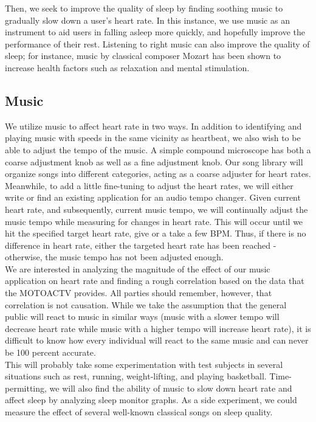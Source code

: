 \documentclass[letterpaper,english, 12pt]{scrreprt}
\begin{document}
Then, we seek to improve the quality of sleep by finding soothing music to gradually slow down a user's heart rate. In this instance, we use music as an instrument to aid users in falling asleep more quickly, and hopefully improve the performance of their rest. Listening to right music can also improve the quality of sleep; for instance, music by classical composer Mozart has been shown to increase health factors such as relaxation and mental stimulation.\\
			 
\subsection{Music}
We utilize music to affect heart rate in two ways. In addition to identifying and playing music with speeds in the same vicinity as heartbeat, we also wish to be able to adjust the tempo of the music. A simple compound microscope has both a coarse adjustment knob as well as a fine adjustment knob. Our song library will organize songs into different categories, acting as a coarse adjuster for heart rates. Meanwhile, to add a little fine-tuning to adjust the heart rates, we will either write or find an existing application for an audio tempo changer. Given current heart rate, and subsequently, current music tempo, we will continually adjust the music tempo while measuring for changes in heart rate. This will occur until we hit the specified target heart rate, give or a take a few BPM. Thus, if there is no difference in heart rate, either the targeted heart rate has been reached - otherwise,  the music tempo has not been adjusted enough.\\
			 
We are interested in analyzing the magnitude of the effect of our music application on heart rate and finding a rough correlation based on the data that the MOTOACTV provides. All parties should remember, however, that correlation is not causation. While we take the assumption that the general public will react to music in similar ways (music with a slower tempo will decrease heart rate while music with a higher tempo will increase heart rate), it is difficult to know how every individual will react to the same music and can never be 100 percent accurate.\\

This will probably take some experimentation with test subjects in several situations such as rest, running, weight-lifting, and playing basketball. Time-permitting, we will also find the ability of music to slow down heart rate and affect sleep by analyzing sleep monitor graphs. As a side experiment, we could measure the effect of several well-known classical songs on sleep quality.\\
			 
\end{document}

